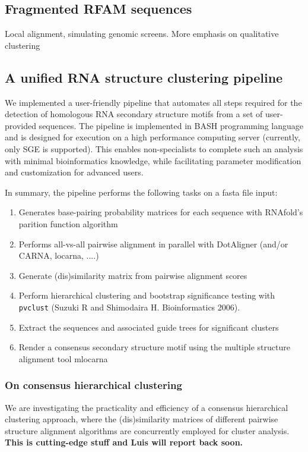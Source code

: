 \documentclass[a4paper,twoside]{article}
\newcommand\pvclust{\texttt{pvclust}}
\begin{document}
\subsection{Fragmented RFAM sequences} 

Local alignment, simulating genomic screens. More emphasis on qualitative clustering


\subsection{ A unified RNA structure clustering pipeline }

\noindent We implemented a user-friendly pipeline that automates all steps required 
for the detection of homologous RNA secondary structure motifs from a set of user-
provided sequences. The pipeline is implemented in BASH programming language and is 
designed for execution on a high performance computing server (currently, only SGE 
is supported). This enables non-specialists to complete such an analysis with 
minimal bioinformatics knowledge, while facilitating parameter modification and 
customization for advanced users. 

In summary, the pipeline performs the following tasks on a fasta file input:
\begin{enumerate}
\item Generates base-pairing probability matrices for each sequence with RNAfold's parition function algorithm 
\item Performs all-vs-all pairwise alignment in parallel with DotAligner (and/or CARNA, locarna, ....)
\item Generate (dis)similarity matrix from pairwise alignment scores 
\item Perform hierarchical clustering and bootstrap significance testing with \pvclust{} (Suzuki R and Shimodaira H. Bioinformatics 2006).
\item Extract the sequences and associated guide trees for significant clusters
\item Render a consensus secondary structure motif using the multiple structure alignment tool mlocarna
\end{enumerate}


\subsubsection{ On consensus hierarchical clustering }

We are investigating the practicality and efficiency of a consensus
hierarchical clustering approach, where the (dis)similarity matrices of
different pairwise structure alignment algorithms are concurrently employed for
cluster analysis. \textbf{This is cutting-edge stuff and Luis will report back
soon. }
\end{document}
